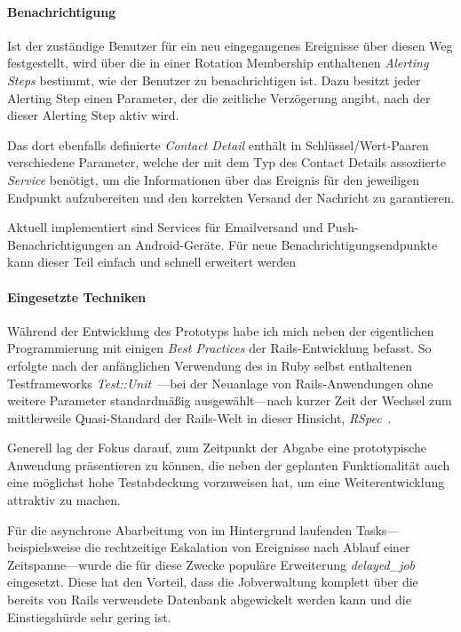 \documentclass[11pt,utf8,notoc,bibnum,german,final]{zihpub}
\begin{document}
\paragraph{Benachrichtigung}

Ist der zuständige Benutzer für ein neu eingegangenes Ereignisse über diesen
Weg festgestellt, wird über die in einer Rotation Membership enthaltenen
\emph{Alerting Steps} bestimmt, wie der Benutzer zu benachrichtigen ist. Dazu
besitzt jeder Alerting Step einen Parameter, der die zeitliche Verzögerung
angibt, nach der dieser Alerting Step aktiv wird.

Das dort ebenfalls definierte \emph{Contact Detail} enthält in
Schlüssel/Wert-Paaren verschiedene Parameter, welche der mit dem Typ des
Contact Details assoziierte \emph{Service} benötigt, um die Informationen über
das Ereignis für den jeweiligen Endpunkt aufzubereiten und den korrekten
Versand der Nachricht zu garantieren.

Aktuell implementiert sind Services für Emailversand und
Push-Benachrichtigungen an Android-Geräte. Für neue Benachrichtigungsendpunkte
kann dieser Teil einfach und schnell erweitert werden


\paragraph{Eingesetzte Techniken}

Während der Entwicklung des Prototyps habe ich mich neben der eigentlichen
Programmierung mit einigen \emph{Best Practices} der Rails-Entwicklung befasst.
So erfolgte nach der anfänglichen Verwendung des in Ruby selbst enthaltenen
Testframeworks \emph{Test::Unit}~\cite{testunit}—bei der Neuanlage von
Rails-Anwendungen ohne weitere Parameter standardmäßig ausgewählt—nach kurzer
Zeit der Wechsel zum mittlerweile Quasi-Standard der Rails-Welt in dieser
Hinsicht, \emph{RSpec}~\cite{rspec}.


Generell lag der Fokus darauf, zum Zeitpunkt der Abgabe eine prototypische
Anwendung präsentieren zu können, die neben der geplanten Funktionalität auch
eine möglichst hohe Testabdeckung vorzuweisen hat, um eine Weiterentwicklung
attraktiv zu machen.

Für die asynchrone Abarbeitung von im Hintergrund laufenden
Tasks—beispielsweise die rechtzeitige Eskalation von Ereignisse nach Ablauf
einer Zeitspanne—wurde die für diese Zwecke populäre Erweiterung
\emph{delayed\_job}~\cite{delayedjob} eingesetzt. Diese hat den Vorteil, dass
die Jobverwaltung komplett über die bereits von Rails verwendete Datenbank
abgewickelt werden kann und die Einstiegshürde sehr gering ist.
\end{document}
